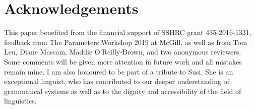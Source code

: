 \documentclass[output=paper,colorlinks,citecolor=brown,
]{langscibook}
\begin{document}
\section*{Acknowledgements}
This paper benefited from the financial support of SSHRC grant 435-2016-1331, feedback from The Parameters Workshop 2019 at McGill, as well as from Tom Leu, Diane Massam, Maddie O'Reilly-Brown, and two anonymous reviewers.  Some comments will be given more attention in future work and all mistakes remain mine.  I am also honoured to be part of a tribute to Susi.  She is an exceptional linguist, who has contributed to our deeper understanding of grammatical systems as well as to the dignity and accessibility of the field of linguistics.


\printbibliography[heading=subbibliography,notkeyword=this]
\end{document}
